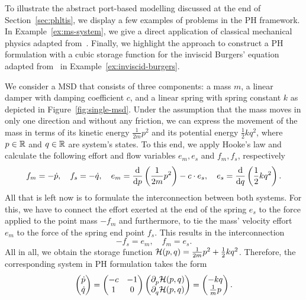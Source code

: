 To illustrate the abstract port-based modelling discussed at the end of Section~\ref{sec:phltis}, we display a few examples of problems in the \ac{PH} framework.
In Example~\ref{ex:ms-system}, we give a direct application of classical mechanical physics adapted from~\cite[Example~2.1]{VanDerSchaft2014}.
Finally, we highlight the approach to construct a \ac{PH} formulation with a cubic storage function for the inviscid Burgers' equation adapted from~\cite[Example~2.1]{Maschke2005} in Example~\ref{ex:inviscid-burgers}.

\begin{example}\label{ex:ms-system}
    We consider a \ac{MSD} that consists of three components: a mass $m$, a linear damper with damping coefficient $c$, and a linear spring with spring constant $k$ as depicted in Figure~\ref{fig:single-msd}.
    Under the assumption that the mass moves in only one direction and without any friction, we can express the movement of the mass in terms of its kinetic energy $\frac{1}{2m} p^2$ and its potential energy $\frac{1}{2} k q^2$, where $p \in \bb{R}$ and $q \in \bb{R}$ are system's states.
    To this end, we apply Hooke's law and calculate the following effort and flow variables $e_m, e_s$ and $f_m, f_s$, respectively
    \begin{equation*}
        f_m = -\dot{p},\quad f_s = -\dot{q},\quad e_m = \frac{\dif}{\dif p} \left( \frac{1}{2m} p^2 \right) - c \cdot e_s,\quad e_s = \frac{\dif}{\dif q} \left( \frac{1}{2} k q^2 \right).
    \end{equation*}
    All that is left now is to formulate the interconnection between both systems.
    For this, we have to connect the effort exerted at the end of the spring $e_s$ to the force applied to the point mass $-f_m$ and furthermore, to tie the mass' velocity effort $e_m$ to the force of the spring end point $f_s$.
    This results in the interconnection
    \begin{equation*}
        -f_s = e_m,\quad f_m = e_s.
    \end{equation*}
    All in all, we obtain the storage function $\mcl{H}(p, q) = \frac{1}{2m} p^2 + \frac{1}{2} k q^2$.
    Therefore, the corresponding system in \ac{PH} formulation takes the form
    \begin{equation*}
        \begin{pmatrix}
            \dot{p} \\
            \dot{q}
        \end{pmatrix} =
        \begin{pmatrix}
            -c & -1 \\
            1 & 0
        \end{pmatrix}
        \begin{pmatrix}
            \pd[p]{} \mcl{H}(p, q) \\
            \pd[q]{} \mcl{H}(p, q)
        \end{pmatrix} =
        \begin{pmatrix}
            -k q \\
            \frac{1}{m} p
        \end{pmatrix}.
    \end{equation*}


\end{example}
